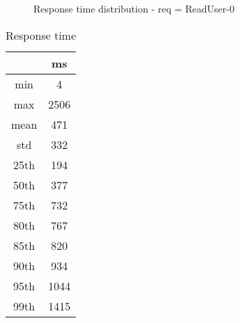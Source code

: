 \begin{minipage}{0.75\linewidth}
\begin{figure}[h]
\begin{adjustbox}{max width=1.0\linewidth, keepaspectratio}
  \end{adjustbox}
  \caption{Response time distribution - req = ReadUser-0}
\end{figure}
\end{minipage}\hfill\begin{minipage}{0.18\linewidth}
\begin{table}[h]
\begin{tabular}{|cc|}
\hline
\textbf{} & \textbf{ms}\\ \hline
 \Xhline{0.005\arrayrulewidth}
min & 4\\
 \Xhline{0.005\arrayrulewidth}
max & 2506\\
 \Xhline{0.005\arrayrulewidth}
mean & 471\\
 \Xhline{0.005\arrayrulewidth}
std & 332\\
\hline
\hline
 \Xhline{0.005\arrayrulewidth}
25th & 194\\
 \Xhline{0.005\arrayrulewidth}
50th & 377\\
 \Xhline{0.005\arrayrulewidth}
75th & 732\\
 \Xhline{0.005\arrayrulewidth}
80th & 767\\
 \Xhline{0.005\arrayrulewidth}
85th & 820\\
 \Xhline{0.005\arrayrulewidth}
90th & 934\\
 \Xhline{0.005\arrayrulewidth}
95th & 1044\\
 \Xhline{0.005\arrayrulewidth}
99th & 1415\\
\hline
\end{tabular}
\caption{Response time}
\end{table}
\end{minipage}\hfill